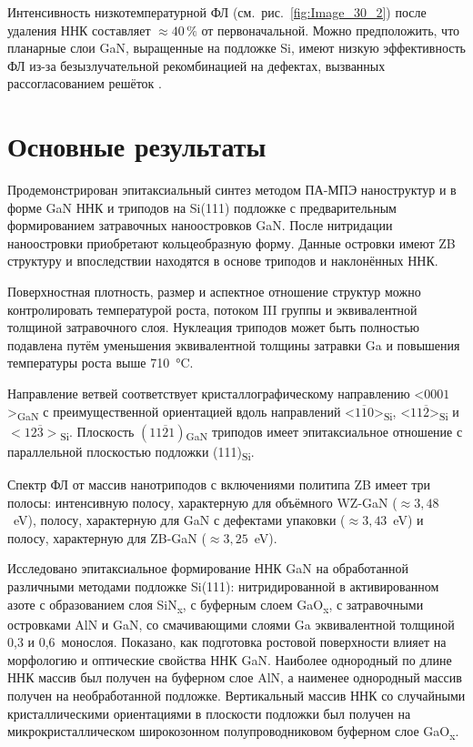 Интенсивность низкотемпературной ФЛ (см.~рис.~\cref{fig:Image_30_2}) после
удаления ННК составляет \(\approx 40\,\%\) от первоначальной. Можно
предположить, что планарные слои GaN, выращенные на подложке Si, имеют низкую
эффективность ФЛ из-за безызлучательной рекомбинацией на дефектах, вызванных
рассогласованием решёток \cite{Calleja1999, Reshchikov2005}.

\section{Основные результаты}\label{sec:ch3/sec8}

Продемонстрирован эпитаксиальный синтез методом ПА-МПЭ наноструктур и в форме
GaN ННК и триподов на Si(111) подложке с предварительным формированием
затравочных наноостровков GaN. После нитридации наноостровки приобретают
кольцеобразную форму. Данные островки имеют ZB структуру и впоследствии
находятся в основе триподов и наклонённых ННК.

Поверхностная плотность, размер и аспектное отношение структур можно
контролировать температурой роста, потоком III группы и эквивалентной толщиной
затравочного слоя. Нуклеация триподов может быть полностью подавлена путём
уменьшения эквивалентной толщины затравки Ga и повышения температуры роста выше
710~\si{\degreeCelsius}.

Направление ветвей соответствует кристаллографическому направлению
<\(0001\)>\textsubscript{GaN} с преимущественной ориентацией вдоль направлений
<\(1\overline{1}0\)>\textsubscript{Si}, <\(11\overline{2}\)>\textsubscript{Si}
и \(<12\overline{3}>\)\textsubscript{Si}. Плоскость
\((11\overline{2}1)\)\textsubscript{GaN} триподов имеет эпитаксиальное
отношение с параллельной плоскостью подложки (111)\textsubscript{Si}.

Спектр ФЛ от массив нанотриподов с включениями политипа ZB имеет три полосы:
интенсивную полосу, характерную для объёмного WZ-GaN (\(\approx
3,48\)~\si{\electronvolt}), полосу, характерную для GaN с дефектами упаковки
(\(\approx 3,43\)~\si{\electronvolt}) и полосу, характерную для ZB-GaN
(\(\approx 3,25\)~\si{\electronvolt}).

Исследовано эпитаксиальное формирование ННК GaN на обработанной различными
методами подложке Si(111): нитридированной в активированном азоте с
образованием слоя SiN\textsubscript{x}, с буферным слоем GaO\textsubscript{x},
с затравочными островками AlN и GaN, со смачивающими слоями Ga эквивалентной
толщиной 0,3 и 0,6~монослоя. Показано, как подготовка ростовой поверхности
влияет на морфологию и оптические свойства ННК GaN. Наиболее однородный по
длине ННК массив был получен на буферном слое AlN, а наименее однородный массив
получен на необработанной подложке. Вертикальный массив ННК со случайными
кристаллическими ориентациями в плоскости подложки был получен на
микрокристаллическом широкозонном полупроводниковом буферном слое
GaO\textsubscript{x}.

